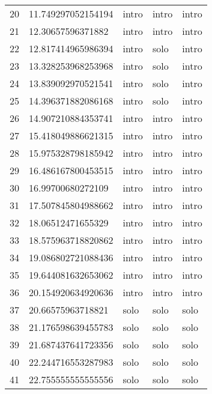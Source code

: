 \begin{table}[]
\begin{tabular}{lllll}
    20   & 11.749297052154194 & intro        & intro           & intro          \\
    21   & 12.30657596371882  & intro        & intro           & intro          \\
    22   & 12.817414965986394 & intro        & solo            & intro          \\
    23   & 13.328253968253968 & intro        & solo            & intro          \\
    24   & 13.839092970521541 & intro        & solo            & intro          \\
    25   & 14.396371882086168 & intro        & solo            & intro          \\
    26   & 14.907210884353741 & intro        & intro           & intro          \\
    27   & 15.418049886621315 & intro        & intro           & intro          \\
    28   & 15.975328798185942 & intro        & intro           & intro          \\
    29   & 16.486167800453515 & intro        & intro           & intro          \\
    30   & 16.99700680272109  & intro        & intro           & intro          \\
    31   & 17.507845804988662 & intro        & intro           & intro          \\
    32   & 18.06512471655329  & intro        & intro           & intro          \\
    33   & 18.575963718820862 & intro        & intro           & intro          \\
    34   & 19.086802721088436 & intro        & intro           & intro          \\
    35   & 19.644081632653062 & intro        & intro           & intro          \\
    36   & 20.154920634920636 & intro        & intro           & intro          \\
    37   & 20.66575963718821  & solo         & solo            & solo           \\
    38   & 21.176598639455783 & solo         & solo            & solo           \\
    39   & 21.687437641723356 & solo         & solo            & solo           \\
    40   & 22.244716553287983 & solo         & solo            & solo           \\
    41   & 22.755555555555556 & solo         & solo            & solo           \\

\end{tabular}
\end{table}
